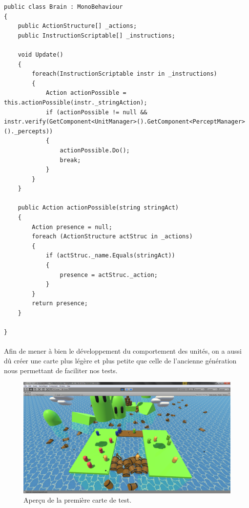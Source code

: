 \documentclass{report}
\begin{document}
\begin{lstlisting}[language={[Sharp]C},label={lst:firstBrainScript}, caption=  Première version de la classe Brain.cs]
public class Brain : MonoBehaviour
{
    public ActionStructure[] _actions;
    public InstructionScriptable[] _instructions;

    void Update()
    {
        foreach(InstructionScriptable instr in _instructions)
        {
            Action actionPossible = this.actionPossible(instr._stringAction);
            if (actionPossible != null && instr.verify(GetComponent<UnitManager>().GetComponent<PerceptManager>()._percepts))
            {
                actionPossible.Do();
                break;
            }
        }
    }

    public Action actionPossible(string stringAct)
    {
        Action presence = null;
        foreach (ActionStructure actStruc in _actions)
        {
            if (actStruc._name.Equals(stringAct))
            {
                presence = actStruc._action;
            }
        }
        return presence;
    }

}
\end{lstlisting}

\paragraph{}Afin de mener à bien le développement du comportement des unités, on a aussi dû créer une carte plus légère et plus petite que celle de l'ancienne génération nous permettant de faciliter nos tests.


\begin{figure}[h!]
        	\centering
	\includegraphics[scale=0.35]{FirstMapImage}
	\caption{Aperçu de la première carte de test.}
\end{figure}
\end{document}
